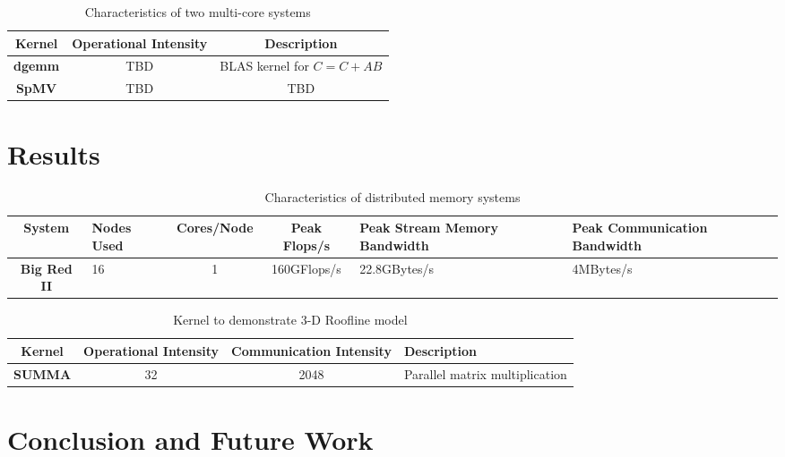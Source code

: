 \documentclass[dvips,12pt]{article}
\begin{document}
\begin{table}[h]
\centering
\begin{tabular}{|c|c|c|}
\hline
\textbf{Kernel} &\textbf{Operational Intensity} &\textbf{Description}\\
\hline
\textbf{dgemm} & TBD & BLAS kernel for $C = C + AB$  \\
\hline
\textbf{SpMV} & TBD & TBD \\
\hline			
\end{tabular}
\caption{Characteristics of two multi-core systems }
\label{kernels}
\end{table} 




\section{Results}

\begin{table}[h]
\centering
\begin{tabular}{|c|L|c|c|L|L|}
\hline
\textbf{System} &\textbf{Nodes Used} &\textbf{Cores/Node} &\textbf{Peak Flops/s} &\textbf{Peak Stream Memory Bandwidth} &\textbf{Peak Communication Bandwidth}\\
\hline
\textbf{Big Red II} & 16 & 1 & 160GFlops/s & 22.8GBytes/s & 4MBytes/s  \\
\hline			
\end{tabular}
\caption{Characteristics of distributed memory systems }
\label{Results_system}
\end{table} 

\begin{table}[h]
\centering
\begin{tabular}{|c|c|c|L|}
\hline
\textbf{Kernel} &\textbf{Operational Intensity} &\textbf{Communication Intensity} &\textbf{Description}\\
\hline
\textbf{SUMMA} & 32 & 2048 & Parallel matrix multiplication  \\
\hline			
\end{tabular}
\caption{Kernel to demonstrate 3-D Roofline model }
\label{Results_kernel}
\end{table} 

\section{Conclusion and Future Work}
\end{document}
